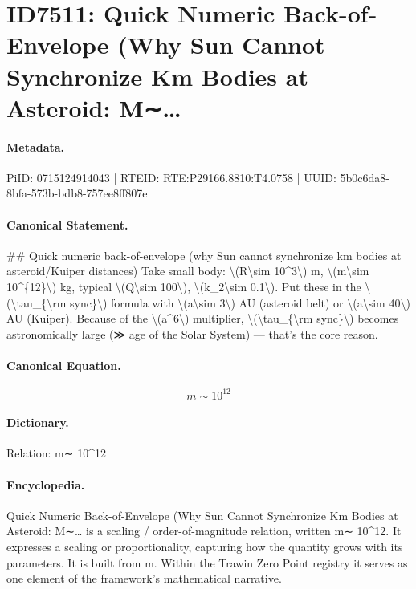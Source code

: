 \section*{ID7511: Quick Numeric Back-of-Envelope (Why Sun Cannot Synchronize Km Bodies at Asteroid: M∼…}
\paragraph{Metadata.}
PiID: 0715124914043 | RTEID: RTE:P29166.8810:T4.0758 | UUID: 5b0c6da8-8bfa-573b-bdb8-757ee8ff807e

\paragraph{Canonical Statement.}
\#\# Quick numeric back-of-envelope (why Sun cannot synchronize km bodies at asteroid/Kuiper distances) Take small body: \textbackslash{}(R\textbackslash{}sim 10\textasciicircum{}3\textbackslash{}) m, \textbackslash{}(m\textbackslash{}sim 10\textasciicircum{}\{12\}\textbackslash{}) kg, typical \textbackslash{}(Q\textbackslash{}sim 100\textbackslash{}), \textbackslash{}(k\_2\textbackslash{}sim 0.1\textbackslash{}). Put these in the \textbackslash{}(\textbackslash{}tau\_\{\textbackslash{}rm sync\}\textbackslash{}) formula with \textbackslash{}(a\textbackslash{}sim 3\textbackslash{}) AU (asteroid belt) or \textbackslash{}(a\textbackslash{}sim 40\textbackslash{}) AU (Kuiper). Because of the \textbackslash{}(a\textasciicircum{}6\textbackslash{}) multiplier, \textbackslash{}(\textbackslash{}tau\_\{\textbackslash{}rm sync\}\textbackslash{}) becomes astronomically large (≫ age of the Solar System) — that’s the core reason.

\paragraph{Canonical Equation.}
\[
m\sim 10^{12}
\]

\paragraph{Dictionary.}
Relation: m∼ 10\textasciicircum{}12

\paragraph{Encyclopedia.}
Quick Numeric Back-of-Envelope (Why Sun Cannot Synchronize Km Bodies at Asteroid: M∼… is a scaling / order-of-magnitude relation, written m∼ 10\textasciicircum{}12. It expresses a scaling or proportionality, capturing how the quantity grows with its parameters. It is built from m. Within the Trawin Zero Point registry it serves as one element of the framework's mathematical narrative.
